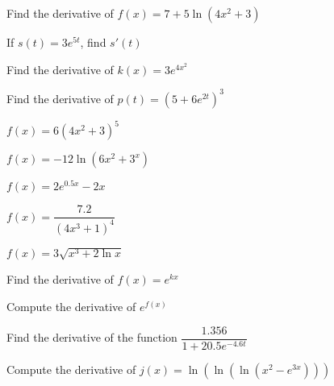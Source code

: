 \documentclass[notes]{subfiles}
\begin{document}
 		\begin{ex}
			Find the derivative of $f(x) = 7 + 5\ln (4x^2+3)$
 		\end{ex}
 		
 		\begin{ex}
 			If $s(t) = 3e^{5t}$, find $s'(t)$
 		\end{ex}
 			
 		\begin{ex}
 			Find the derivative of $k(x) = 3e^{4x^2}$
 		\end{ex}
 			\newpage
 			
 		\begin{ex}
 			Find the derivative of $p(t) = (5+6e^{2t})^3$
 		\end{ex}
 			
 		\begin{ex}
 			$f(x) = 6(4x^2+3)^5$
 		\end{ex}
 			
 		\begin{ex}
 			$f(x) = -12\ln (6x^2+3^x)$
 		\end{ex}
 			\newpage
 			 
 		\begin{ex}
 			$f(x) = 2e^{0.5x} - 2x$
 		\end{ex}
 			
 		\begin{ex}
 			$f(x) = \dfrac{7.2}{(4x^3+1)^4}$
 		\end{ex}
 			
 		\begin{ex}
 			$f(x) = 3\sqrt{x^3 + 2\ln x}$
 		\end{ex}
 			\newpage
 			
 		\begin{ex}
 			Find the derivative of $f(x) = e^{kx}$
 		\end{ex}
 			
 		\begin{ex}
 			Compute the derivative of $e^{f(x)}$
 		\end{ex}
 			
 		\begin{ex}
 			Find the derivative of the function $\dfrac{1.356}{1+20.5e^{-4.6t}}$
 		\end{ex}
 			\newpage
 			
 		\begin{ex}
 			Compute the derivative of $j(x) = \ln (\ln (\ln (x^2-e^{3x})))$
 		\end{ex}
 			
\end{document}
